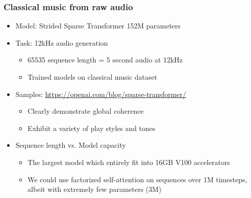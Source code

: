 \documentclass[dvipdfmx]{beamer}
\begin{document}
\begin{frame}
    \frametitle{Classical music from raw audio}
    \begin{itemize}
        \item Model: Strided Sparse Transformer 152M parameters
        \item Task: 12kHz audio generation
        \begin{itemize}
            \item 65535 sequence length = 5 second audio at 12kHz
            \item Trained models on classical music dataset
        \end{itemize}
        \item Samples: {\footnotesize \url{https://openai.com/blog/sparse-transformer/}}
        \begin{itemize}
            \item Clearly demonstrate global coherence
            \item Exhibit a variety of play styles and tones
        \end{itemize}
    \end{itemize}
    \begin{itemize}
        \item Sequence length vs. Model capacity
        \begin{itemize}
            \item The largest model which entirely fit into 16GB V100 accelerators
            \item We could use factorized self-attention on sequences over 1M timesteps, \\
                albeit with extremely few parameters (3M)
        \end{itemize}
    \end{itemize}
\end{frame}
\end{document}
